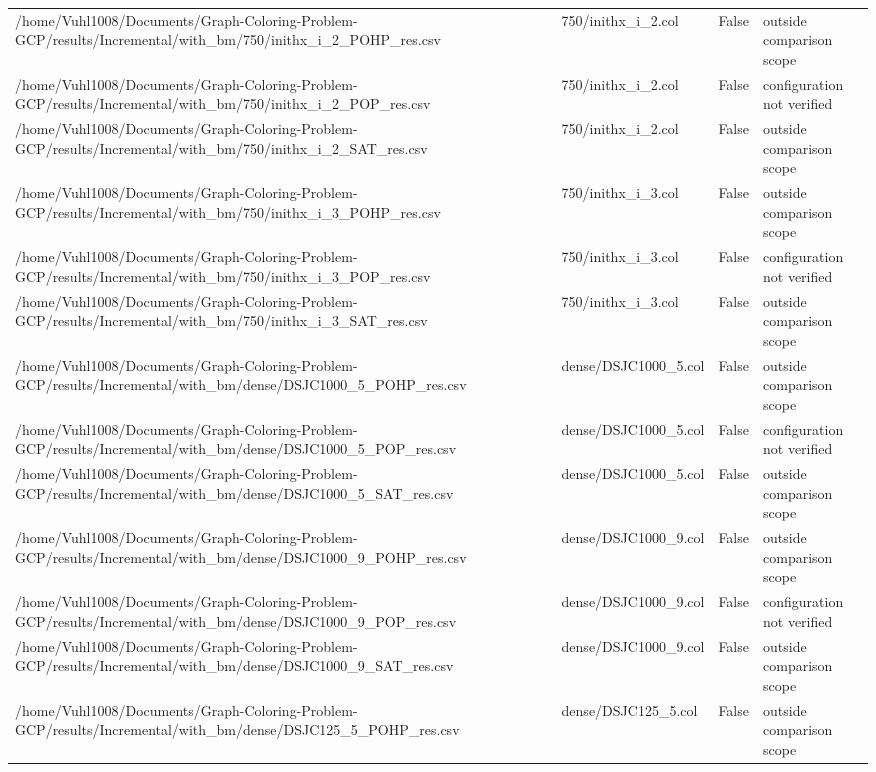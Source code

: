 \begin{table}[htbp]
\begin{tabular}{llll}
/home/Vuhl1008/Documents/Graph-Coloring-Problem-GCP/results/Incremental/with\_bm/750/inithx\_i\_2\_POHP\_res.csv & 750/inithx\_i\_2.col & False & outside comparison scope \\
/home/Vuhl1008/Documents/Graph-Coloring-Problem-GCP/results/Incremental/with\_bm/750/inithx\_i\_2\_POP\_res.csv & 750/inithx\_i\_2.col & False & configuration not verified \\
/home/Vuhl1008/Documents/Graph-Coloring-Problem-GCP/results/Incremental/with\_bm/750/inithx\_i\_2\_SAT\_res.csv & 750/inithx\_i\_2.col & False & outside comparison scope \\
/home/Vuhl1008/Documents/Graph-Coloring-Problem-GCP/results/Incremental/with\_bm/750/inithx\_i\_3\_POHP\_res.csv & 750/inithx\_i\_3.col & False & outside comparison scope \\
/home/Vuhl1008/Documents/Graph-Coloring-Problem-GCP/results/Incremental/with\_bm/750/inithx\_i\_3\_POP\_res.csv & 750/inithx\_i\_3.col & False & configuration not verified \\
/home/Vuhl1008/Documents/Graph-Coloring-Problem-GCP/results/Incremental/with\_bm/750/inithx\_i\_3\_SAT\_res.csv & 750/inithx\_i\_3.col & False & outside comparison scope \\
/home/Vuhl1008/Documents/Graph-Coloring-Problem-GCP/results/Incremental/with\_bm/dense/DSJC1000\_5\_POHP\_res.csv & dense/DSJC1000\_5.col & False & outside comparison scope \\
/home/Vuhl1008/Documents/Graph-Coloring-Problem-GCP/results/Incremental/with\_bm/dense/DSJC1000\_5\_POP\_res.csv & dense/DSJC1000\_5.col & False & configuration not verified \\
/home/Vuhl1008/Documents/Graph-Coloring-Problem-GCP/results/Incremental/with\_bm/dense/DSJC1000\_5\_SAT\_res.csv & dense/DSJC1000\_5.col & False & outside comparison scope \\
/home/Vuhl1008/Documents/Graph-Coloring-Problem-GCP/results/Incremental/with\_bm/dense/DSJC1000\_9\_POHP\_res.csv & dense/DSJC1000\_9.col & False & outside comparison scope \\
/home/Vuhl1008/Documents/Graph-Coloring-Problem-GCP/results/Incremental/with\_bm/dense/DSJC1000\_9\_POP\_res.csv & dense/DSJC1000\_9.col & False & configuration not verified \\
/home/Vuhl1008/Documents/Graph-Coloring-Problem-GCP/results/Incremental/with\_bm/dense/DSJC1000\_9\_SAT\_res.csv & dense/DSJC1000\_9.col & False & outside comparison scope \\
/home/Vuhl1008/Documents/Graph-Coloring-Problem-GCP/results/Incremental/with\_bm/dense/DSJC125\_5\_POHP\_res.csv & dense/DSJC125\_5.col & False & outside comparison scope \\

\end{tabular}
\end{table}
